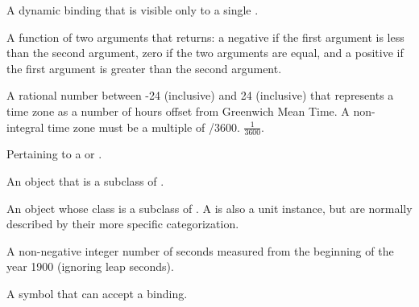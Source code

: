 \begin{glossary-list}
%
%
A dynamic binding that is visible only to a single .


%
%
A function of two arguments that returns: a negative  if the
first argument is less than the second argument, zero if the two arguments are
equal, and a positive  if the first argument is greater than the
second argument.


%
%
A rational number between -24 (inclusive) and 24 (inclusive) that represents a
time zone as a number of hours offset from Greenwich Mean Time. A non-integral
time zone must be a multiple of 
%
/3600.  
\T$\frac{1}{3600}$.


\glent[unit]
%
%
%
%
%
Pertaining to a  or .


%
%
%
%
%
%
%
An object that is a subclass of .


%
%
%
%
%
%
%
%
%
An object whose class is a subclass of
. A  is
also a unit instance, but  are normally described by
their more specific categorization.


%
%
A non-negative integer number of seconds measured from the beginning of the
year 1900 (ignoring leap seconds).


%
%
A symbol that can accept a binding.

\end{glossary-list}

